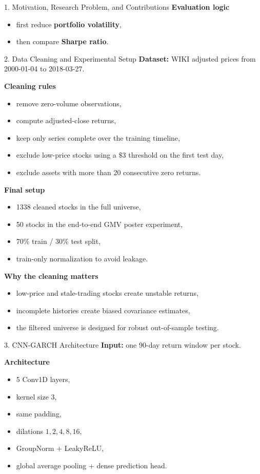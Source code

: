 \documentclass[final]{beamer}
\newlength{\colwidth}
\begin{document}
\begin{frame}[t]
\begin{columns}[t,totalwidth=\textwidth]
\begin{column}{\colwidth}
\begin{block}{1. Motivation, Research Problem, and Contributions}
\textbf{Evaluation logic}
\begin{itemize}
\item first reduce \textbf{portfolio volatility},
\item then compare \textbf{Sharpe ratio}.
\end{itemize}
\end{block}

\begin{block}{2. Data Cleaning and Experimental Setup}
\small
\textbf{Dataset:} WIKI adjusted prices from 2000-01-04 to 2018-03-27.

\textbf{Cleaning rules}
\begin{itemize}
\item remove zero-volume observations,
\item compute adjusted-close returns,
\item keep only series complete over the training timeline,
\item exclude low-price stocks using a \(\$3\) threshold on the first test day,
\item exclude assets with more than 20 consecutive zero returns.
\end{itemize}

\textbf{Final setup}
\begin{itemize}
\item 1338 cleaned stocks in the full universe,
\item 50 stocks in the end-to-end GMV poster experiment,
\item 70\% train / 30\% test split,
\item train-only normalization to avoid leakage.
\end{itemize}

\textbf{Why the cleaning matters}
\begin{itemize}
\item low-price and stale-trading stocks create unstable returns,
\item incomplete histories create biased covariance estimates,
\item the filtered universe is designed for robust out-of-sample testing.
\end{itemize}
\end{block}

\begin{block}{3. CNN-GARCH Architecture}
\small
\textbf{Input:} one 90-day return window per stock.

\textbf{Architecture}
\begin{itemize}
\item 5 Conv1D layers,
\item kernel size \(3\),
\item same padding,
\item dilations \(1,2,4,8,16\),
\item GroupNorm + LeakyReLU,
\item global average pooling + dense prediction head.
\end{itemize}


\end{block}
\end{column}
\end{columns}
\end{frame}
\end{document}

